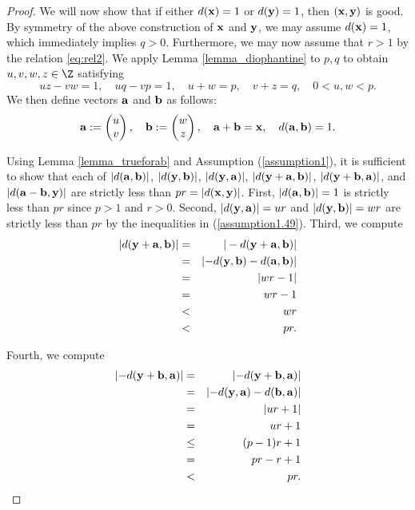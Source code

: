 \begin{proof}
	We will now show that if either $d({\mathbf{x}})=1$ or $d({\mathbf{y}})=1$, then $({\mathbf{x}},{\mathbf{y}})$ is good. By symmetry of the above construction of ${\mathbf{x}}$ and ${\mathbf{y}}$, we may assume $d({\mathbf{x}})=1$, which immediately implies $q>0$. Furthermore, we may now assume that $r>1$ by the relation \eqref{eq:rel2}. We apply Lemma \ref{lemma_diophantine} to $p, q$ to obtain  $u,v,w,z \in \Z$ satisfying 
	\begin{equation}\label{assumption1.49}
	uz - vw = 1,\quad uq - vp = 1,\quad u + w = p,\quad v + z = q,\quad 0 < u,w < p.
	\end{equation}
	We then define vectors ${\mathbf{a}}$ and ${\mathbf{b}}$ as follows:
	\begin{equation}\label{assumption1.9}
	\aab := \begin{pmatrix}  u\\ v\end{pmatrix},\quad 
	\bb := \begin{pmatrix} w\\ z\end{pmatrix},
	\quad \aab + \bb = \xx,\quad d(\aab, \bb) = 1. %
	\end{equation}

	Using Lemma \ref{lemma_trueforab} and Assumption (\ref{assumption1}), it is sufficient to show that each of $\lvert d({\mathbf{a}}, {\mathbf{b}}) \rvert$, $\lvert d({\mathbf{y}},{\mathbf{b}}) \rvert$, $ \lvert d({\mathbf{y}},{\mathbf{a}}) \rvert$, $\lvert d({\mathbf{y}}+{\mathbf{a}},{\mathbf{b}}) \rvert$, $\lvert d({\mathbf{y}}+{\mathbf{b}},{\mathbf{a}}) \rvert$, and $\lvert d({\mathbf{a}}-{\mathbf{b}},{\mathbf{y}}) \rvert$ are strictly less than $pr = \lvert d({\mathbf{x}},{\mathbf{y}}) \rvert$. First, $ \lvert d({\mathbf{a}},{\mathbf{b}}) \rvert = 1$ is strictly less than $pr$ since $p>1$ and $r>0$. Second, $ \lvert d({\mathbf{y}},{\mathbf{a}}) \rvert = ur $ and $ \lvert d({\mathbf{y}},{\mathbf{b}}) \rvert = wr $ are strictly less than $pr$ by the inequalities in (\ref{assumption1.49}). Third, we compute
	\begin{eqnarray*}
		\vert d({\mathbf{y}}+{\mathbf{a}}, {\mathbf{b}}) \rvert &=&\vert - d({\mathbf{y}}+{\mathbf{a}}, {\mathbf{b}}) \rvert \\
		&=& \lvert - d({\mathbf{y}},{\mathbf{b}}) - d({\mathbf{a}}, {\mathbf{b}}) \rvert \\
		&=& \lvert wr - 1 \rvert \\
		&=& wr-1 \\
		&<& wr \\
		&<& pr.
	\end{eqnarray*}

	Fourth, we compute
	\begin{eqnarray*}
		\lvert -d({\mathbf{y}}+{\mathbf{b}}, {\mathbf{a}}) \rvert &=& \lvert -d({\mathbf{y}}+{\mathbf{b}}, {\mathbf{a}}) \rvert \\
		&=& \lvert -d({\mathbf{y}},{\mathbf{a}}) - d({\mathbf{b}}, {\mathbf{a}}) \rvert \\
		&=& \lvert ur + 1 \rvert \\
		&=& ur+1 \\
		&\leq& (p-1)r+1 \\
		&=& pr-r+1 \\
		&<& pr.
	\end{eqnarray*}


\end{proof}
